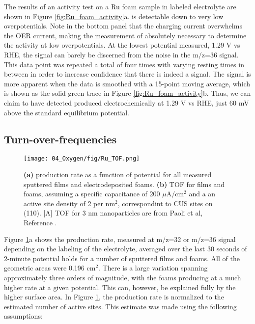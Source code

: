 The results of an activity test on a Ru foam sample in labeled electrolyte are shown in Figure \ref{fig:Ru_foam_activity}a.  is detectable down to very low overpotentials. Note in the bottom panel that the charging current overwhelms the OER current, making the measurement of  absolutely necessary to determine the activity at low overpotentials. At the lowest potential measured, 1.29 V vs RHE, the signal can barely be discerned from the noise in the m/z=36 signal. This data point was repeated a total of four times with varying resting times in between in order to increase confidence that there is indeed a signal. The signal is more apparent when the data is smoothed with a 15-point moving average, which is shown as the solid green trace in Figure \ref{fig:Ru_foam_activity}b. Thus, we can claim to have detected  produced electrochemically at 1.29 V vs RHE, just 60 mV above the standard equilibrium potential.


\subsection{Turn-over-frequencies}\label{subsec:TOF}

\begin{figure}[h!]
	\centering
	\texttt{[image: 04\_Oxygen/fig/Ru\_TOF.png]}
	\caption{\textbf{(a)}  production rate as a function of potential for all measured sputtered  films and electrodeposited  foams. \textbf{(b)} TOF for films and foams, assuming a specific capacitance of 200 $\mu$A/cm$^2$ and a an active site density of 2 per nm$^2$, correspondint to CUS sites on (110)\cite{Rao2017}. [A] TOF for 3 nm  nanoparticles are from Paoli et al, Reference .}
	\label{fig:Ru_TOF}
\end{figure}

Figure \ref{fig:Ru_TOF}a shows the  production rate, measured at m/z=32 or m/z=36 signal depending on the labeling of the electrolyte, averaged over the last 30 seconds of 2-minute potential holds for a number of  sputtered films and  foams. All of the geometric areas were 0.196 cm$^2$. There is a large variation spanning approximately three orders of magnitude, with the  foams producing  at a much higher rate at a given potential. This can, however, be explained fully by the higher surface area. In Figure \ref{fig:Ru_TOF}, the  production rate is normalized to the estimated number of active sites. This estimate was made using the following assumptions:

